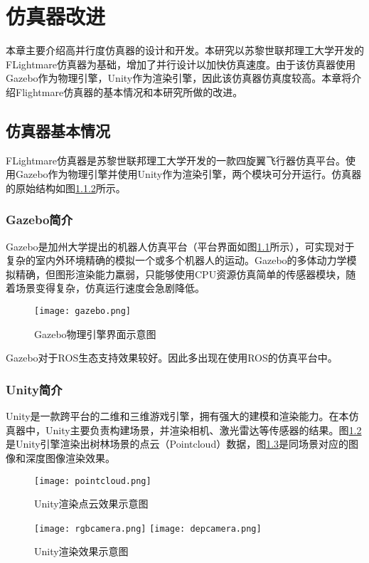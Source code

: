 
\chapter{仿真器改进}
本章主要介绍高并行度仿真器的设计和开发。本研究以苏黎世联邦理工大学开发的FLightmare仿真器为基础，增加了并行设计以加快仿真速度。由于该仿真器使用Gazebo作为物理引擎，Unity作为渲染引擎，因此该仿真器仿真度较高。本章将介绍Flightmare仿真器的基本情况和本研究所做的改进。

\section{仿真器基本情况}
FLightmare仿真器\cite{flightmare}是苏黎世联邦理工大学开发的一款四旋翼飞行器仿真平台。使用Gazebo作为物理引擎并使用Unity作为渲染引擎，两个模块可分开运行。仿真器的原始结构如图\ref{}所示。

\subsection{Gazebo简介}
Gazebo是加州大学提出的机器人仿真平台（平台界面如图\ref{fig_gazebo}所示），可实现对于复杂的室内外环境精确的模拟一个或多个机器人的运动。Gazebo的多体动力学模拟精确，但图形渲染能力羸弱，只能够使用CPU资源仿真简单的传感器模块，随着场景变得复杂，仿真运行速度会急剧降低。
\begin{figure}
  \centering
  \texttt{[image: gazebo.png]}
  \label{fig_gazebo}
  \caption{Gazebo物理引擎界面示意图}
\end{figure}
Gazebo对于ROS生态支持效果较好。因此多出现在使用ROS的仿真平台中。

\subsection{Unity简介}
Unity是一款跨平台的二维和三维游戏引擎\cite{unity}，拥有强大的建模和渲染能力。在本仿真器中，Unity主要负责构建场景，并渲染相机、激光雷达等传感器的结果。图\ref{fig_pointcloud}是Unity引擎渲染出树林场景的点云（Pointcloud）数据，图\ref{fig_camera}是同场景对应的图像和深度图像渲染效果。
\begin{figure}
  \centering
  \texttt{[image: pointcloud.png]}
  \label{fig_pointcloud}
  \caption{Unity渲染点云效果示意图}
\end{figure}
\begin{figure}
  \centering  
    {\texttt{[image: rgbcamera.png]}}
    {\texttt{[image: depcamera.png]}}
  \caption{Unity渲染效果示意图}
  \label{fig_camera}
\end{figure}

